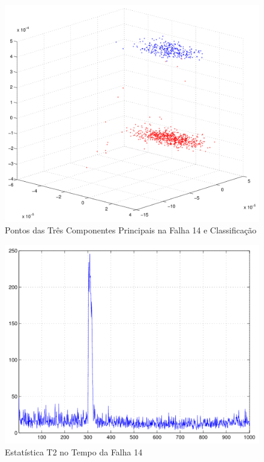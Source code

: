 \documentclass[journal]{IEEEtran}
\begin{document}
\begin{figure}[H]
	\centering
  \includegraphics[scale=0.6]{figs/fault14/pontos3D.pdf}
  \caption{Pontos das Três Componentes Principais na Falha 14 e Classificação}
	\label{fig:f14:3d}
\end{figure}

\begin{figure}[H]
	\centering
  \includegraphics[scale=0.6]{figs/fault14/T2_tempo.pdf}
  \caption{Estatística T2 no Tempo da Falha 14}
	\label{fig:f14:t2}
\end{figure}
\end{document}
